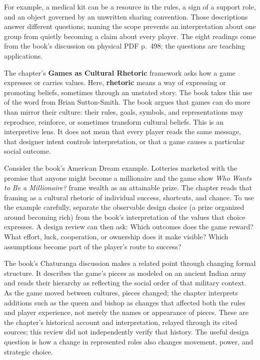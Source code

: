 For example, a medical kit can be a resource in the rules, a sign of a support role, and an object governed by an unwritten sharing convention. Those descriptions answer different questions; naming the scope prevents an interpretation about one group from quietly becoming a claim about every player. The eight readings come from the book's discussion on physical PDF p.~498; the questions are teaching applications.

The chapter's \textbf{Games as Cultural Rhetoric} framework asks how a game expresses or carries values. Here, \textbf{rhetoric} means a way of expressing or promoting beliefs, sometimes through an unstated story. The book takes this use of the word from Brian Sutton-Smith. The book argues that games can do more than mirror their culture: their rules, goals, symbols, and representations may reproduce, reinforce, or sometimes transform cultural beliefs. This is an interpretive lens. It does not mean that every player reads the same message, that designer intent controls interpretation, or that a game causes a particular social outcome.

Consider the book's American Dream example. Lotteries marketed with the promise that anyone might become a millionaire and the game show \emph{Who Wants to Be a Millionaire?} frame wealth as an attainable prize. The chapter reads that framing as a cultural rhetoric of individual success, shortcuts, and chance. To use the example carefully, separate the observable design choice (a prize organized around becoming rich) from the book's interpretation of the values that choice expresses. A design review can then ask: Which outcomes does the game reward? What effort, luck, cooperation, or ownership does it make visible? Which assumptions become part of the player's route to success?

The book's Chaturanga discussion makes a related point through changing formal structure. It describes the game's pieces as modeled on an ancient Indian army and reads their hierarchy as reflecting the social order of that military context. As the game moved between cultures, pieces changed; the chapter interprets additions such as the queen and bishop as changes that affected both the rules and player experience, not merely the names or appearance of pieces. These are the chapter's historical account and interpretation, relayed through its cited sources; this review did not independently verify that history. The useful design question is how a change in represented roles also changes movement, power, and strategic choice.

